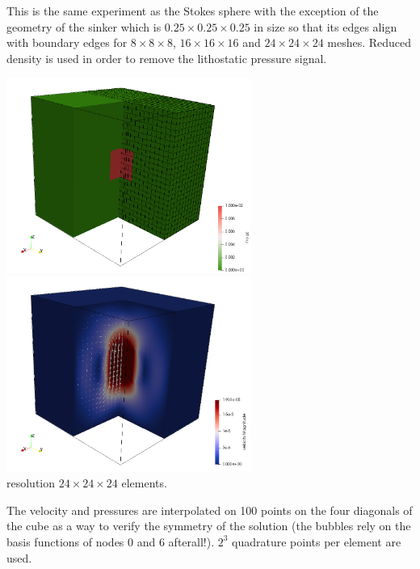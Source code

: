 This is the same experiment as the Stokes sphere with the exception of the geometry of the sinker which 
is $0.25\times 0.25 \times 0.25$ in size so that its edges align with boundary edges 
for $8 \times 8 \times 8$, $16 \times 16 \times 16$ and $24 \times 24 \times 24$ meshes.
Reduced density is used in order to remove the lithostatic pressure signal.
 
\begin{center}
\includegraphics[width=8cm]{python_codes/fieldstone_82/results/bench4/rho}
\includegraphics[width=8cm]{python_codes/fieldstone_82/results/bench4/vel}\\
{\captionfont resolution $24\times 24 \times 24$ elements.}
\end{center}

The velocity and pressures are interpolated on 100 points on the four diagonals of the cube
as a way to verify the symmetry of the solution (the bubbles rely on the basis 
functions of nodes 0 and 6 afterall!). $2^3$ quadrature points per element are used. 

